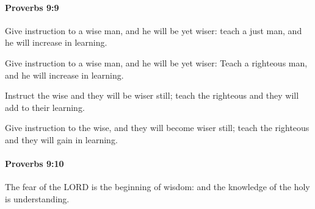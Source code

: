 		\paragraph{Proverbs 9:9} %
			\label{PROVERBS-9-9}

			Give instruction to a wise man, and he will be yet wiser: teach a just man, and he will increase in learning.

			\begin{versebox}
					\item[BHS] 
					\item[ASV] Give instruction to a wise man, and he will be yet wiser: Teach a righteous man, and he will increase in learning.
					\item[NIV] Instruct the wise and they will be wiser still; teach the righteous and they will add to their learning.
					\item[NRSV] Give instruction to the wise, and they will become wiser still; teach the righteous and they will gain in learning.
			\end{versebox}

		\paragraph{Proverbs 9:10} %
			\label{PROVERBS-9-10}

			The fear of the LORD is the beginning of wisdom: and the knowledge of the holy is understanding.

